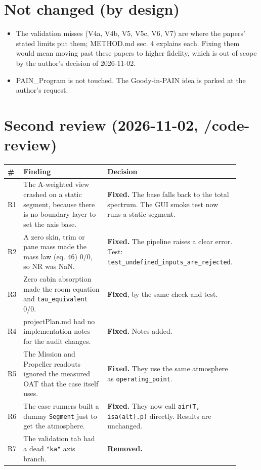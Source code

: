 \documentclass[10pt,a4paper]{article}
\begin{document}
\section*{Not changed (by design)}

\begin{itemize}
\item The validation misses (V4a, V4b, V5, V5c, V6, V7) are where the papers' stated limits put them; METHOD.md sec. 4 explains each. Fixing them would mean moving past these papers to higher fidelity, which is out of scope by the author's decision of 2026-11-02.
\item PAIN\_Program is not touched. The Goody-in-PAIN idea is parked at the author's request.
\end{itemize}

\section*{Second review (2026-11-02, /code-review)}

{\small
\begin{longtable}{>{\raggedright\arraybackslash}p{0.037\linewidth}>{\raggedright\arraybackslash}p{0.436\linewidth}>{\raggedright\arraybackslash}p{0.436\linewidth}}
\hline
\textbf{\#} & \textbf{Finding} & \textbf{Decision} \\
\hline
\endhead
R1 & The A-weighted view crashed on a static segment, because there is no boundary layer to set the axis base. & \textbf{Fixed.} The base falls back to the total spectrum. The GUI smoke test now runs a static segment. \\
R2 & A zero skin, trim or pane mass made the mass law (eq. 46) 0/0, so NR was NaN. & \textbf{Fixed.} The pipeline raises a clear error. Test: \texttt{test\_\allowbreak{}undefined\_\allowbreak{}inputs\_\allowbreak{}are\_\allowbreak{}rejected}. \\
R3 & Zero cabin absorption made the room equation and \texttt{tau\_\allowbreak{}equivalent} 0/0. & \textbf{Fixed}, by the same check and test. \\
R4 & projectPlan.md had no implementation notes for the audit changes. & \textbf{Fixed.} Notes added. \\
R5 & The Mission and Propeller readouts ignored the measured OAT that the case itself uses. & \textbf{Fixed.} They use the same atmosphere as \texttt{operating\_\allowbreak{}point}. \\
R6 & The case runners built a dummy \texttt{Segment} just to get the atmosphere. & \textbf{Fixed.} They now call \texttt{air(T, isa(alt).\allowbreak{}p)} directly. Results are unchanged. \\
R7 & The validation tab had a dead \texttt{"ka"} axis branch. & \textbf{Removed.} \\
\hline
\end{longtable}}
\end{document}
